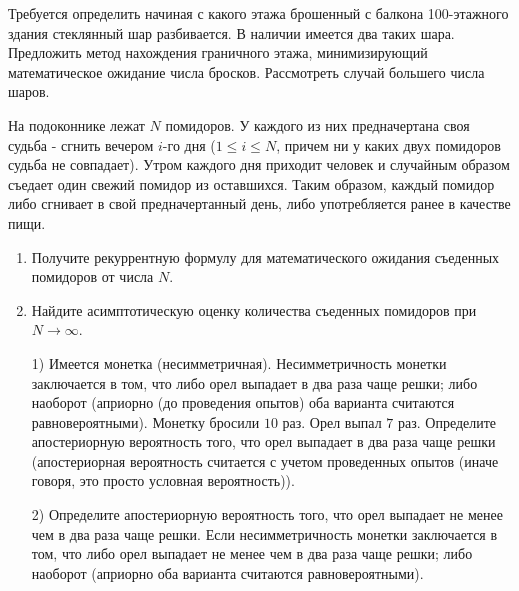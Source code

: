 \begin{problem}

Требуется определить начиная с какого этажа брошенный с балкона 100-этажного здания стеклянный шар разбивается. В наличии имеется два таких шара. Предложить метод нахождения граничного этажа, минимизирующий математическое ожидание числа бросков. Рассмотреть случай большего числа шаров.  

\end{problem}

\begin{problem}
На подоконнике лежат $N$ помидоров. У каждого из них предначертана своя судьба - сгнить вечером $i$-го дня ($1 \leqslant i \leqslant N$, причем ни у каких двух помидоров судьба не совпадает). Утром каждого дня приходит человек и случайным образом съедает один свежий помидор из оставшихся. Таким образом, каждый помидор либо сгнивает в свой предначертанный день, либо употребляется ранее в качестве пищи.

\begin{enumerate}
\item Получите рекуррентную формулу для математического ожидания съеденных помидоров от числа $N$.
\item Найдите асимптотическую оценку количества съеденных помидоров при $N \rightarrow \infty$.
\end{enumerate}

\end{problem}

\begin{problem}
\begin{enumerate}
\item[1)] Имеется монетка (несимметричная). Несимметричность монетки заключается в том, что либо орел выпадает в два раза чаще решки; 
либо наоборот (априорно (до проведения опытов) оба варианта считаются равновероятными). Монетку бросили $10$ раз. Орел выпал $7$ раз. 
Определите апостериорную вероятность того, что орел выпадает в два раза чаще решки (апостериорная вероятность считается с учетом 
проведенных опытов (иначе говоря, это просто условная вероятность)). 

\item[2)] Определите апостериорную вероятность того, что орел выпадает не менее чем в два раза чаще решки. Если несимметричность 
монетки заключается в том, что либо орел выпадает не менее чем в два раза чаще решки; либо наоборот (априорно оба варианта считаются 
равновероятными). 
\end{enumerate}
\end{problem}

